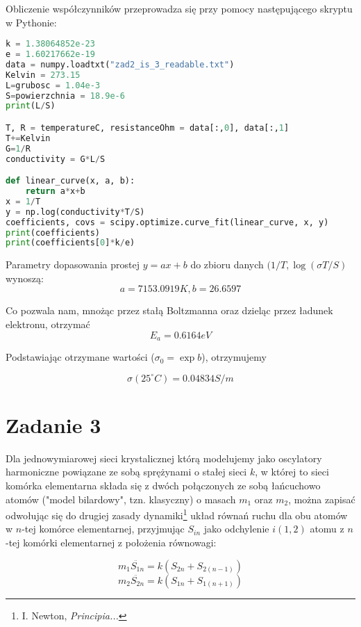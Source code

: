 \documentclass[11pt]{article}
\begin{document}
Obliczenie współczynników przeprowadza się przy pomocy następującego skryptu w Pythonie:
\begin{lstlisting}[language=Python]
k = 1.38064852e-23
e = 1.60217662e-19
data = numpy.loadtxt("zad2_is_3_readable.txt")
Kelvin = 273.15
L=grubosc = 1.04e-3
S=powierzchnia = 18.9e-6
print(L/S)

T, R = temperatureC, resistanceOhm = data[:,0], data[:,1]
T+=Kelvin
G=1/R
conductivity = G*L/S

def linear_curve(x, a, b):
    return a*x+b
x = 1/T
y = np.log(conductivity*T/S)
coefficients, covs = scipy.optimize.curve_fit(linear_curve, x, y)
print(coefficients)
print(coefficients[0]*k/e)
\end{lstlisting}

Parametry dopasowania prostej $y=ax+b$ do zbioru danych $(1/T, \log{(\sigma T/S)}$ wynoszą:
\[a = 7153.0919 K, b = 26.6597\]

Co pozwala nam, mnożąc przez stałą Boltzmanna oraz dzieląc przez ładunek elektronu, otrzymać
\[ E_a = 0.6164 eV \]

Podstawiając otrzymane wartości ($\sigma_0 = \exp{b}$), otrzymujemy

\[ \sigma(25^{\circ}C) = 0.04834 S/m \]
\section{Zadanie 3}
Dla jednowymiarowej sieci krystalicznej którą modelujemy jako oscylatory harmoniczne
powiązane ze sobą sprężynami o stałej sieci $k$, w której to sieci komórka elementarna składa się
z dwóch połączonych ze sobą łańcuchowo atomów ("model bilardowy", tzn. klasyczny) o masach $m_1$ oraz $m_2$, można zapisać
odwołując się do drugiej zasady dynamiki\footnote{I. Newton, \textit{Principia...}}
układ równań ruchu dla obu atomów w $n$-tej komórce elementarnej, przyjmując $S_{in}$ jako odchylenie
$i (1, 2)$ atomu z $n$-tej komórki elementarnej z położenia równowagi:

\[m_1\ddot{S_{1n}} = k(S_{2n}+S_{2 (n-1)}) \]
\[m_2\ddot{S_{2n}} = k(S_{1n}+S_{1 (n+1)}) \]
\end{document}
